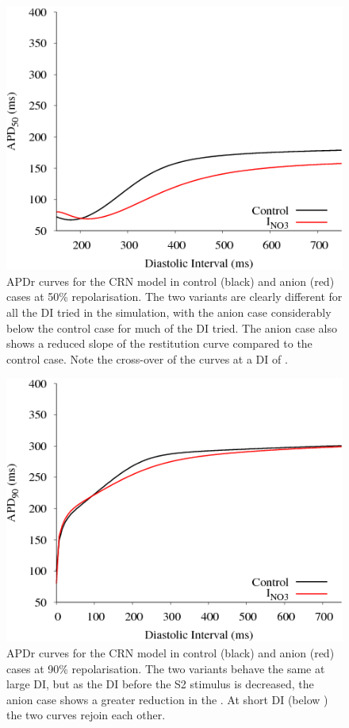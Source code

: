 \begin{figure}
\includegraphics{figures/toolkit/anion/03_S1S2_50}
\caption[Anion Sensitive APD Restitution at 50 repolarization]{
\label{anion:apdr50} APDr curves for the CRN model in control (black) and anion
(red) cases at 50\% repolarisation.  The two variants are clearly different for
all the DI tried in the simulation, with the anion case considerably below the
control case for much of the DI tried.  The anion case also shows a reduced
slope of the restitution curve compared to the control case.  Note the
cross-over of the curves at a DI of .}
\end{figure}

\begin{figure}
\includegraphics{figures/toolkit/anion/02_S1S2_90}
\caption[Anion Sensitive APD Restitution at 90 repolarization]{
\label{anion:apdr90} APDr curves for the CRN model in control (black) and anion
(red) cases at 90\% repolarisation.  The two variants behave the same at large
DI, but as the DI before the S2 stimulus is decreased, the anion case shows a
greater reduction in the \apd.  At short DI (below ) the two curves
rejoin each other.}
\end{figure}

